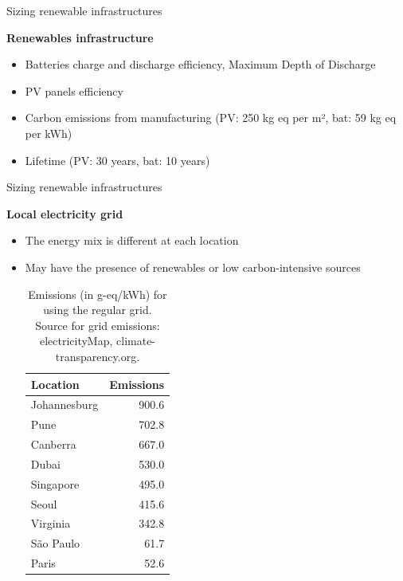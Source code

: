 \documentclass[Ligatures=TeX,table,svgnames,usetotalslideindicator,compress,10pt]{beamer}
\begin{document}
\begin{frame}{Sizing renewable infrastructures}
  
  \textbf{Renewables infrastructure}
  
  \begin{itemize}    
  \item Batteries charge and discharge efficiency, Maximum Depth of Discharge
  \item PV panels efficiency    
  \item Carbon emissions from manufacturing (PV: 250 kg  eq per m², bat: 59 kg  eq per kWh)
  \item Lifetime (PV: 30 years, bat: 10 years)      
  \end{itemize}
  
\end{frame}

\begin{frame}{Sizing renewable infrastructures}
  
  \textbf{Local electricity grid}
  
  \begin{itemize}
    
  \item The energy mix is different at each location
  \item May have the presence of renewables or low carbon-intensive sources    
    
    \begin{table}
      
      \caption{Emissions (in g-eq/kWh) for using the regular grid. Source for grid emissions: electricityMap, climate-transparency.org.}\label{tab:carbonfootprint} \centering
      \footnotesize
      \begin{tabular}{|l|r|}
        
        \hline

        \textbf{Location} &  \textbf{Emissions }  \\
        \hline
        Johannesburg & 900.6  \\
        \hline
        Pune & 702.8\\
        \hline
        Canberra & 667.0 \\
        \hline
        Dubai & 530.0   \\
        \hline
        Singapore & 495.0  \\
        \hline     
        Seoul & 415.6  \\
        \hline
        Virginia  & 342.8  \\
        \hline
        São Paulo &  61.7 \\
        \hline 
        Paris &  52.6  \\
        \hline  

      \end{tabular}  
    \end{table}
    
  \end{itemize}
  \normalsize
\end{frame}
\end{document}
